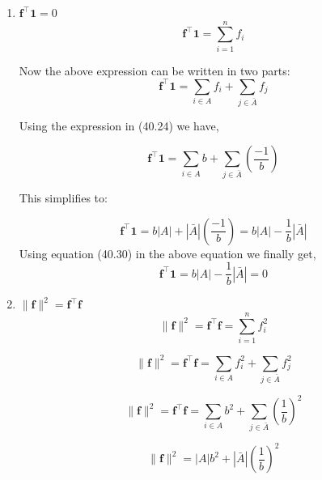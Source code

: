 \documentclass[english]{article}
\theoremstyle{plain}
\begin{document}
\begin{enumerate}
\item $\boldsymbol{f}^{\top}\boldsymbol{1} = 0$
\begin{equation}
\boldsymbol{f}^{\top}\boldsymbol{1} =\sum_{i=1}^{n} f_{i}
\end{equation}

Now the above expression can be written in two parts:
\begin{equation}
\boldsymbol{f}^{\top}\boldsymbol{1} =\sum_{i\in A} f_{i} + \sum_{j \in \bar{A}} f_{j}
\end{equation}

Using the expression in (40.24) we have,

\begin{equation}
\boldsymbol{f}^{\top}\boldsymbol{1} =\sum_{i\in A} b + \sum_{j \in \bar{A}} \left(\frac{-1}{b}\right)
\end{equation}

This simplifies to:

\begin{equation}
\boldsymbol{f}^{\top}\boldsymbol{1} = b \left|A\right| + \left|\bar{A}\right| \left(\frac{-1}{b}\right) = b\left|A\right| - \frac{1}{b}\left|\bar{A}\right|
\end{equation}
Using equation (40.30) in the above equation we finally get,
\begin{equation}
\boldsymbol{f}^{\top}\boldsymbol{1} = b\left|A\right| - \frac{1}{b}\left|\bar{A}\right| = 0
\end{equation}

\item $\|\boldsymbol{f}\|^{2} = \boldsymbol{f}^{\top}\boldsymbol{f}$  
\begin{equation}
\|\boldsymbol{f}\|^{2} = \boldsymbol{f}^{\top}\boldsymbol{f} = \sum_{i=1}^{n} f_{i}^{2}
\end{equation}

\begin{equation}
\|\boldsymbol{f}\|^{2} = \boldsymbol{f}^{\top}\boldsymbol{f} = \sum_{i \in A} f_{i}^{2} +  \sum_{j \in \bar{A}} f_{j}^{2}
\end{equation}

\begin{equation}
\|\boldsymbol{f}\|^{2} = \boldsymbol{f}^{\top}\boldsymbol{f} = \sum_{i \in A} b^{2} +  \sum_{j \in \bar{A}} \left( \frac{1} {b}\right)^{2}
\end{equation}

\begin{equation}
\|\boldsymbol{f}\|^{2} =\left|A\right| b^{2} +  \left|\bar{A}\right| \left( \frac{1} {b}\right)^{2}
\end{equation}


\end{enumerate}
\end{document}
